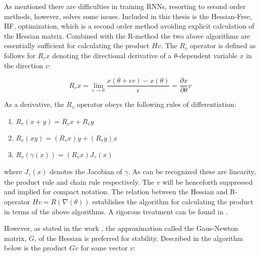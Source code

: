 As mentioned there are difficulties in training RNNs, resorting to second order methods, however, solves some issues. Included in this thesis is the Hessian-Free, HF, optimization, which is a second order method avoiding explicit calculation of the Hessian matrix. Combined with the R-method the two above algorithms are essentially sufficient for calculating the product $Hv$. The $R_v$ operator is defined as follows for $R_vx $ denoting the directional derivative of a $\theta$-dependent variable $x$ in the direction $v$:

\[R_vx = \lim_{\epsilon\to 0} \frac{x(\theta + \epsilon v) - x(\theta)}{\epsilon} = \frac{\partial x}{\partial\theta}v\]

As a derivative, the $R_v$ operator obeys the following rules of differentiation:

\begin{enumerate}
    \item $R_v(x+y) = R_vx + R_vy$
    \item $ R_v(xy) = (R_vx)y + (R_vy)x $
    \item $R_v(\gamma(x)) = (R_vx) J_{\gamma}(x)$
\end{enumerate}

where $J_\gamma(x)$ denotes the Jacobian of $\gamma$. As can be recognized these are linearity, the product rule and chain rule respectively. The $v$ will be henceforth suppressed and implied for compact notation. The relation between the Hessian and R-operator $Hv = R(\nabla(\theta))$ establishes the algorithm for calculating the product in terms of the above algorithms. A rigorous treatment can be found in \cite{suts}.

However, as stated in the work \cite{suts}, the approximation called the Gaus-Newton matrix, \(G\), of the Hessian is preferred for stability. Described in the algorithm below is the product \(Gv\) for some vector $v$:

\begin{algorithmic}[1]
    \EndFor
    \EndFor
    \State {}
\end{algorithmic}

